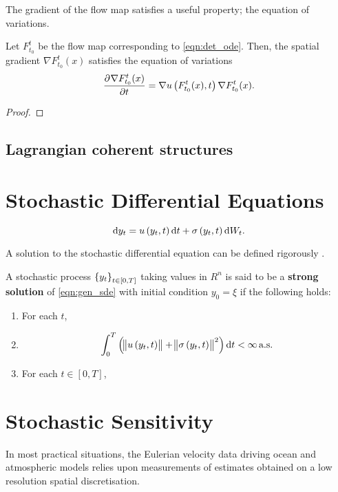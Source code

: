The gradient of the flow map satisfies a useful property; the equation of variations.
\begin{theorem}
	Let \(F_{t_0}^{t}\) be the flow map corresponding to \eqref{eqn:det_ode}.
	Then, the spatial gradient \(\nabla F_{t_0}^t(x)\) satisfies the equation of variations
	\begin{equation}
		\dpd{\nabla F_{t_0}^{t}(x)}{t} = \nabla u\left(F_{t_0}^t(x), t\right) \nabla F_{t_0}^t(x).
		\label{eqn:eqn_of_variations}
	\end{equation}
\end{theorem}
\begin{proof}

\end{proof}


\subsection{Lagrangian coherent structures}


\section{Stochastic Differential Equations}


\begin{equation}
	\dif y_t = u\left(y_t, t\right)\dif t + \sigma\left(y_t, t\right)\dif W_t.
	\label{eqn:gen_sde}
\end{equation}

A solution to the stochastic differential equation can be defined rigorously \cite{KallianpurSundar_2014_StochasticAnalysisDiffusion}.
\begin{defn}
	A stochastic process \(\set{y_t}_{t \in [0,T]}\) taking values in \(R^n\) is said to be a \textbf{strong solution} of \eqref{eqn:gen_sde} with initial condition \(y_0 = \xi\) if the following holds:
	\begin{enumerate}
		\item For each \(t\),
		\item
		      \[
			      \int_0^T{\left(\norm{u\left(y_t, t\right)} + \norm{\sigma\left(y_t, t\right)}^2\right)\dif t} < \infty \alsu
		      \]

		\item For each \(t \in [0,T]\),
	\end{enumerate}
\end{defn}


\section{Stochastic Sensitivity}
In most practical situations, the Eulerian velocity data driving ocean and atmospheric models relies upon measurements of estimates obtained on a low resolution spatial discretisation.


